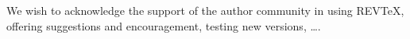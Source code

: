 \documentclass[prc, reprint, amsmath, linenumbers,10pt]{revtex4-1}
\begin{document}
%
%

\begin{acknowledgments}
We wish to acknowledge the support of the author community in using
REV\TeX{}, offering suggestions and encouragement, testing new versions,
\dots.
\end{acknowledgments}






\end{document}
